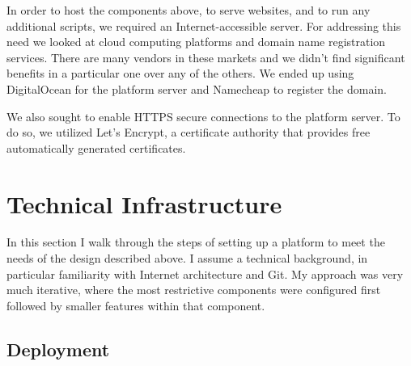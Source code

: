 \documentclass[12pt,twoside]{mitthesis}
\newcommand{\draft}[1]{{#1}}
\begin{document}
\draft{In order to host the components above, to serve websites, and to run any additional scripts, we required an Internet-accessible server. For addressing this need we looked at cloud computing platforms and domain name registration services. There are many vendors in these markets and we didn't find significant benefits in a particular one over any of the others. We ended up using DigitalOcean for the platform server and Namecheap to register the domain.

We also sought to enable HTTPS secure connections to the platform server. To do so, we utilized Let's Encrypt, a certificate authority that provides free automatically generated certificates.}

\section{Technical Infrastructure}

\draft{In this section I walk through the steps of setting up a platform to meet the needs of the design described above. I assume a technical background, in particular familiarity with Internet architecture and Git. My approach was very much iterative, where the most restrictive components were configured first followed by smaller features within that component.}

\subsection{Deployment}
\end{document}
